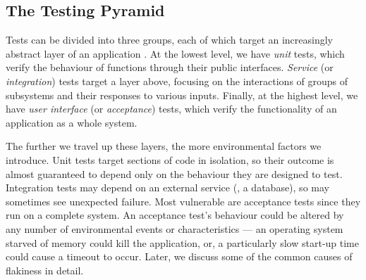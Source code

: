 


\subsection{The Testing Pyramid}
\label{sec:the_testing_pyramid}

Tests can be divided into three groups, each of which target an increasingly abstract layer of an application \citep[see][Chapter~16]{cohn2009succeeding}. At the lowest level, we have \emph{unit} tests, which verify the behaviour of functions through their public interfaces. \emph{Service} (or \emph{integration}) tests target a layer above, focusing on the interactions of groups of subsystems and their responses to various inputs. Finally, at the highest level, we have \emph{user interface} (or \emph{acceptance}) tests, which verify the functionality of an application as a whole system.

The further we travel up these layers, the more environmental factors we introduce. Unit tests target sections of code in isolation, so their outcome is almost guaranteed to depend only on the behaviour they are designed to test. Integration tests may depend on an external service (\eg, a database), so may sometimes see unexpected failure. Most vulnerable are acceptance tests since they run on a complete system. An acceptance test's behaviour could be altered by any number of environmental events or characteristics --- an operating system starved of memory could kill the application, or, a particularly slow start-up time could cause a timeout to occur. Later, we discuss some of the common causes of flakiness in detail.



